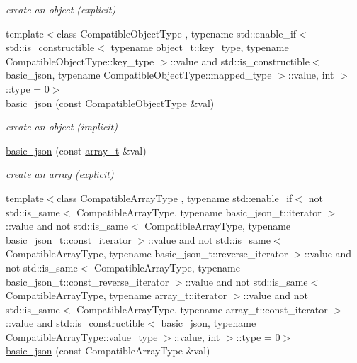 \begin{DoxyCompactItemize}
\begin{DoxyCompactList}\small\item\em create an object (explicit) \end{DoxyCompactList}\item 
{\footnotesize template$<$class Compatible\+Object\+Type , typename std\+::enable\+\_\+if$<$ std\+::is\+\_\+constructible$<$ typename object\+\_\+t\+::key\+\_\+type, typename Compatible\+Object\+Type\+::key\+\_\+type $>$\+::value and std\+::is\+\_\+constructible$<$ basic\+\_\+json, typename Compatible\+Object\+Type\+::mapped\+\_\+type $>$\+::value, int $>$\+::type  = 0$>$ }\\\hyperlink{classnlohmann_1_1basic__json_ab7be2bc58ae0c2c2c30d40f15d6399f8}{basic\+\_\+json} (const Compatible\+Object\+Type \&val)
\begin{DoxyCompactList}\small\item\em create an object (implicit) \end{DoxyCompactList}\item 
\hyperlink{classnlohmann_1_1basic__json_a3aaf41d385f0d9a93deb92f9b14ae0cf}{basic\+\_\+json} (const \hyperlink{classnlohmann_1_1basic__json_ab00b882d39306d663c23dab110f5cae0}{array\+\_\+t} \&val)
\begin{DoxyCompactList}\small\item\em create an array (explicit) \end{DoxyCompactList}\item 
{\footnotesize template$<$class Compatible\+Array\+Type , typename std\+::enable\+\_\+if$<$ not std\+::is\+\_\+same$<$ Compatible\+Array\+Type, typename basic\+\_\+json\+\_\+t\+::iterator $>$\+::value and not std\+::is\+\_\+same$<$ Compatible\+Array\+Type, typename basic\+\_\+json\+\_\+t\+::const\+\_\+iterator $>$\+::value and not std\+::is\+\_\+same$<$ Compatible\+Array\+Type, typename basic\+\_\+json\+\_\+t\+::reverse\+\_\+iterator $>$\+::value and not std\+::is\+\_\+same$<$ Compatible\+Array\+Type, typename basic\+\_\+json\+\_\+t\+::const\+\_\+reverse\+\_\+iterator $>$\+::value and not std\+::is\+\_\+same$<$ Compatible\+Array\+Type, typename array\+\_\+t\+::iterator $>$\+::value and not std\+::is\+\_\+same$<$ Compatible\+Array\+Type, typename array\+\_\+t\+::const\+\_\+iterator $>$\+::value and std\+::is\+\_\+constructible$<$ basic\+\_\+json, typename Compatible\+Array\+Type\+::value\+\_\+type $>$\+::value, int $>$\+::type  = 0$>$ }\\\hyperlink{classnlohmann_1_1basic__json_a81aaaab0f3b326afda2d226daab4f1e1}{basic\+\_\+json} (const Compatible\+Array\+Type \&val)

\end{DoxyCompactItemize}
